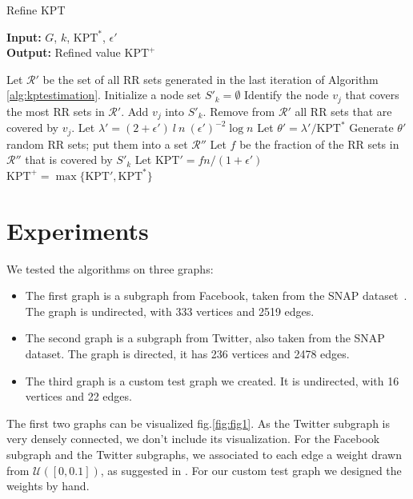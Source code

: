 \documentclass[a4paper,12pt]{article}
\begin{document}
\begin{algorithm}
\caption{Refine KPT}\label{alg:kptrefinement}
\hspace*{\algorithmicindent} \textbf{Input: } $G$, $k$, $\text{KPT}^*$, $\epsilon'$\\
\hspace*{\algorithmicindent} \textbf{Output: } Refined value $\text{KPT}^+$
\begin{algorithmic}[1]
\State Let $\mathcal{R}'$ be the set of all RR sets generated in the last iteration of Algorithm \ref{alg:kptestimation}.
\State Initialize a node set $S'_k = \emptyset$
\State Identify the node $v_j$ that covers the most RR sets in $\mathcal{R}'$.
\State Add $v_j$ into $S'_k$.
\State Remove from $\mathcal{R}'$ all RR sets that are covered by $v_j$.
\EndFor
\State Let $\lambda' = (2+\epsilon') \ l \ n \ (\epsilon')^{-2} \log n$
\State Let $\theta' = \lambda' / \text{KPT}^*$
\State Generate $\theta'$ random RR sets; put them into a set $\mathcal{R}''$
\State Let $f$ be the fraction of the RR sets in $\mathcal{R}''$ that is covered by $S'_k$
\State Let $\text{KPT}' = fn/(1+\epsilon')$
\State\Return $\text{KPT}^+ = \max\{\text{KPT}', \text{KPT}^*\}$
\end{algorithmic}
\end{algorithm}


\section{Experiments}
\label{scn:exp}

We tested the algorithms on three graphs:
\begin{itemize}
 \item The first graph is a subgraph from Facebook, taken from the SNAP dataset~\cite{leskovec2015snap}. The graph is undirected, with 333 vertices and 2519 edges.
\item The second graph is a subgraph from Twitter, also taken from the SNAP dataset. The graph is directed, it has 236 vertices and 2478 edges.
\item The third graph is a custom test graph we created. It is undirected, with 16 vertices and 22 edges.
\end{itemize}
The first two graphs can be visualized fig.\ref{fig:fig1}. As the Twitter subgraph is very densely connected, we don't include its visualization. For the Facebook subgraph and the Twitter subgraphs, we associated to each edge a weight drawn from $\mathcal{U}([0, 0.1])$, as suggested in \cite{wen2016online}. For our custom test graph we designed the weights by hand.
\end{document}
